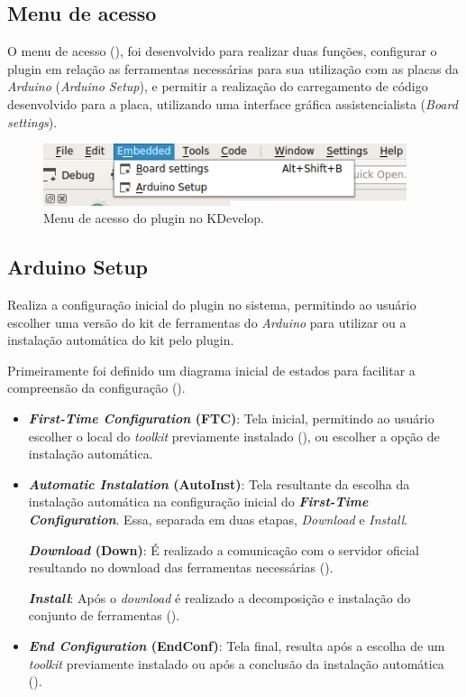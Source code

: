 \subsection{Menu de acesso}

O menu de acesso (), foi desenvolvido para realizar duas funções, configurar o plugin em relação as ferramentas necessárias para sua utilização com as placas da \textit{Arduino} (\textit{Arduino Setup}), e permitir a realização do carregamento de código desenvolvido para a placa, utilizando uma interface gráfica assistencialista (\textit{Board settings}).

\begin{figure}[!htb]
  \centering
  \includegraphics[width=0.95\textwidth]{figuras/kdevelopMenu.png}
  \caption[Menu do plugin no KDevelop]{Menu de acesso do plugin no KDevelop.}
  \label{fig:kdevelopMenu}
\end{figure}

\subsection{Arduino Setup}

Realiza a configuração inicial do plugin no sistema, permitindo ao usuário escolher uma versão do kit de ferramentas do \textit{Arduino} para utilizar ou a instalação automática do kit pelo plugin.

Primeiramente foi definido um diagrama inicial de estados para facilitar a compreensão da configuração ().

\begin{itemize}
\item \textbf{\textit{First-Time Configuration} (FTC)}: Tela inicial, permitindo ao usuário escolher o local do \textit{toolkit} previamente instalado (), ou escolher a opção de instalação automática. 

\item \textbf{\textit{Automatic Instalation} (AutoInst)}: Tela resultante da escolha da instalação automática na configuração inicial do \textbf{\textit{First-Time Configuration}}. Essa, separada em duas etapas, \textit{Download} e \textit{Install}.

\subitem \textbf{\textit{Download} (Down)}: É realizado a comunicação com o servidor oficial resultando no download das ferramentas necessárias ().

\subitem \textbf{\textit{Install}}: Após o \textit{download} é realizado a decomposição e instalação do conjunto de ferramentas ().

\item \textbf{\textit{End Configuration} (EndConf)}: Tela final, resulta após a escolha de um \textit{toolkit} previamente instalado ou após a conclusão da instalação automática ().
\end{itemize}

